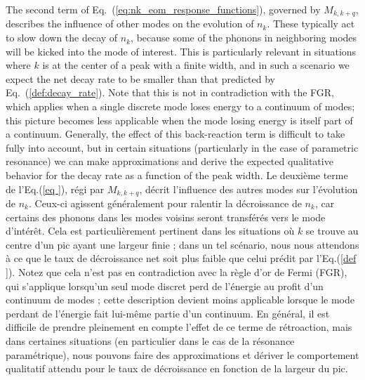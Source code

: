 \documentclass[aps,prd,notitlepage,amsfonts,amssymb,amsmath,nofootinbib,superscriptaddress,longbibliography]{revtex4-2}
\newcommand{\trad}[1]{\textcolor{tradcolor}{#1}}
\begin{document}
The second term of Eq.~(\ref{eq:nk_eom_response_functions}), governed by $M_{k,k+q}$, describes the influence of other modes on the evolution of $n_{k}$.  These typically act to slow down the decay of $n_{k}$, because some of the phonons in neighboring modes will be kicked into the mode of interest.  This is particularly relevant in situations where $k$ is at the center of a peak with a finite width, and in such a scenario we expect the net decay rate to be smaller than that predicted by Eq.~(\ref{def:decay_rate}).
Note that this is not in contradiction with the FGR, which applies when a single discrete mode loses energy to a continuum of modes; this picture becomes less applicable when the mode losing energy is itself part of a continuum.
Generally, the effect of this back-reaction term is difficult to take fully into account, but in certain situations (particularly in the case of parametric resonance) we can make approximations and derive the expected qualitative behavior for the decay rate as a function of the peak width.
\trad{
Le deuxième terme de l'Eq.(\ref{eq
}), régi par $M_{k,k+q}$, décrit l'influence des autres modes sur l'évolution de $n_{k}$. Ceux-ci agissent généralement pour ralentir la décroissance de $n_{k}$, car certains des phonons dans les modes voisins seront transférés vers le mode d'intérêt. Cela est particulièrement pertinent dans les situations où $k$ se trouve au centre d'un pic ayant une largeur finie ; dans un tel scénario, nous nous attendons à ce que le taux de décroissance net soit plus faible que celui prédit par l'Eq.(\ref{def
}).
Notez que cela n'est pas en contradiction avec la règle d'or de Fermi (FGR), qui s'applique lorsqu'un seul mode discret perd de l'énergie au profit d'un continuum de modes ; cette description devient moins applicable lorsque le mode perdant de l'énergie fait lui-même partie d'un continuum.
En général, il est difficile de prendre pleinement en compte l'effet de ce terme de rétroaction, mais dans certaines situations (en particulier dans le cas de la résonance paramétrique), nous pouvons faire des approximations et dériver le comportement qualitatif attendu pour le taux de décroissance en fonction de la largeur du pic.
}
\end{document}
